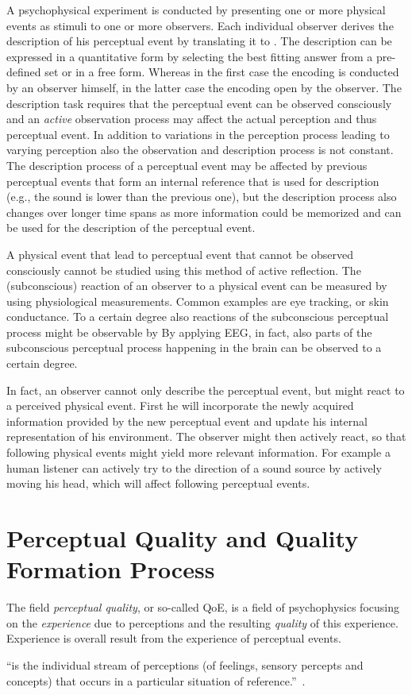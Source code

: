 A psychophysical experiment is conducted by presenting one or more physical events as stimuli to one or more observers.
Each individual observer derives the description of his perceptual event by translating it to . %
The description can be expressed in a quantitative form by selecting the best fitting answer from a pre-defined set or in a free form.
Whereas in the first case the encoding is conducted by an observer himself, in the latter case the encoding open by the observer.
The description task requires that the perceptual event can be observed consciously and an \emph{active} observation process may affect the actual perception and thus perceptual event.%
In addition to variations in the perception process leading to varying perception also the observation and description process is not constant.
The description process of a perceptual event may be affected by previous perceptual events that form an internal reference that is used for description (e.g., the sound is lower than the previous one), but the description process also changes over longer time spans as more information could be memorized and can be used for the description of the perceptual event.

A physical event that lead to perceptual event that cannot be observed consciously cannot be studied using this method of active reflection.
The (subconscious) reaction of an observer to a physical event can be measured by using physiological measurements.
Common examples are eye tracking, or skin conductance.
To a certain degree also reactions of the subconscious perceptual process might be observable by 
By applying \ac{EEG}, in fact, also parts of the subconscious perceptual process happening in the brain can be observed to a certain degree.

In fact, an observer cannot only describe the perceptual event, but might react to a perceived physical event.
First he will incorporate the newly acquired information provided by the new perceptual event and update his internal representation of his environment.
The observer might then actively react, so that following physical events might yield more relevant information.
For example a human listener can actively try to the direction of a sound source by actively moving his head, which will affect following perceptual events.

\section{Perceptual Quality and Quality Formation Process}
The field \emph{perceptual quality}, or so-called \ac{QoE}, is a field of psychophysics focusing on the \emph{experience} due to perceptions and the resulting \emph{quality} of this experience.
Experience is overall result from the experience of perceptual events.
\begin{definition}[Experiencing]
``is the individual stream of perceptions (of feelings, sensory percepts and concepts) that occurs in a particular situation of reference.''~\citep[p. 13]{moller_quality_2014}.
\end{definition}

